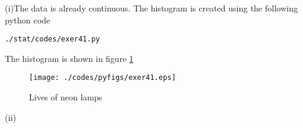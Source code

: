 (i)The data is already continuous. The histogram is created using the following python code\\
\begin{lstlisting}
./stat/codes/exer41.py
\end{lstlisting}
The histogram is shown in figure \ref{fig:hist41_py}
\begin{figure}[!ht]
\centering
\texttt{[image: ./codes/pyfigs/exer41.eps]}
\caption{Lives of neon lamps}
\label{fig:hist41_py}
\end{figure}
(ii)
